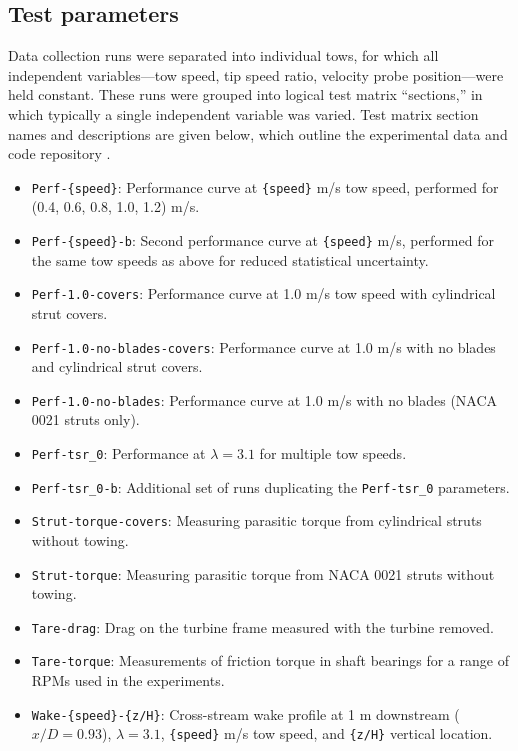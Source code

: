 \documentclass[10pt,letterpaper]{article}
\begin{document}
\subsection*{Test parameters}

Data collection runs were separated into individual tows, for which all
independent variables---tow speed, tip speed ratio, velocity probe
position---were held constant. These runs were grouped into logical test matrix
``sections,'' in which typically a single independent variable was varied. Test
matrix section names and descriptions are given below, which outline the
experimental data and code repository \cite{Bachant2015-RM2-data}.


\begin{itemize}
    
    \item \texttt{Perf-\{speed\}}: Performance curve at \texttt{\{speed\}} m/s
    tow speed, performed for (0.4, 0.6, 0.8, 1.0, 1.2) m/s.
    
    \item \texttt{Perf-\{speed\}-b}: Second performance curve at
    \texttt{\{speed\}} m/s, performed for the same tow speeds as above for
    reduced statistical uncertainty.
    
    \item \texttt{Perf-1.0-covers}: Performance curve at 1.0 m/s tow speed with
    cylindrical strut covers.
    
    \item \texttt{Perf-1.0-no-blades-covers}: Performance curve at 1.0 m/s with
    no blades and cylindrical strut covers.
    
    \item \texttt{Perf-1.0-no-blades}: Performance curve at 1.0 m/s with no
    blades (NACA 0021 struts only).
    
    \item \texttt{Perf-tsr\_0}: Performance at $\lambda=3.1$ for multiple tow
    speeds.
    
    \item \texttt{Perf-tsr\_0-b}: Additional set of runs duplicating the
    \texttt{Perf-tsr\_0} parameters.
    
    \item \texttt{Strut-torque-covers}: Measuring parasitic torque from
    cylindrical struts without towing.
    
    \item \texttt{Strut-torque}: Measuring parasitic torque from
    NACA 0021 struts without towing.
    
    \item \texttt{Tare-drag}: Drag on the turbine frame measured with the turbine
    removed.
    
    \item \texttt{Tare-torque}: Measurements of friction torque in shaft
    bearings for a range of RPMs used in the experiments.
    
    \item \texttt{Wake-\{speed\}-\{z/H\}}: Cross-stream wake profile at 1 m
    downstream ($x/D=0.93$), $\lambda=3.1$, \texttt{\{speed\}} m/s tow speed,
    and \texttt{\{z/H\}} vertical location.
\end{itemize}
\end{document}
